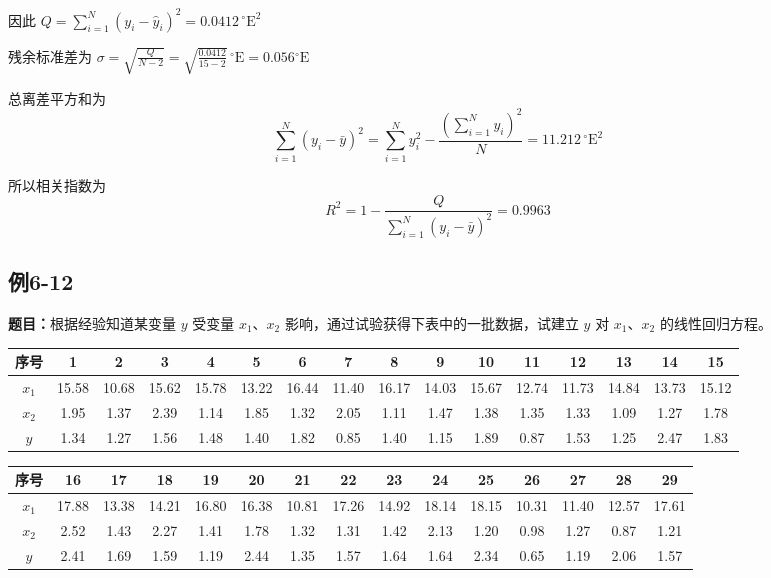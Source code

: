 \documentclass[UTF8,zihao=-4]{ctexart}
\newcommand{\problem}[1]{\subsection*{#1}}
\newcommand{\timu}{\noindent\textbf{题目：}}
\begin{document}
因此 $Q = \sum_{i=1}^{N}(y_i-\hat{y}_i)^2 = 0.0412\,{}^\circ\mathrm{E}^2$

残余标准差为 $\sigma = \sqrt{\frac{Q}{N-2}} = \sqrt{\frac{0.0412}{15-2}}\,{}^\circ\mathrm{E} = 0.056{}^\circ\mathrm{E}$

总离差平方和为
\begin{equation*}
    \sum_{i=1}^{N}(y_i-\bar{y})^2 = \sum_{i=1}^{N}y_i^2 - \frac{\left(\displaystyle\sum_{i=1}^{N}y_i\right)^2}{N} = 11.212\,{}^\circ\mathrm{E}^2
\end{equation*}

所以相关指数为
\begin{equation*}
    R^2 = 1- \frac{Q}{\displaystyle\sum_{i=1}^{N}(y_i-\bar{y})^2} = 0.9963
\end{equation*}

\newpage

\problem{例6-12}

\timu 根据经验知道某变量 $y$ 受变量 $x_1$、$x_2$ 影响，通过试验获得下表中的一批数据，试建立 $y$ 对 $x_1$、$x_2$ 的线性回归方程。

\begin{center}
\scriptsize
\setlength{\tabcolsep}{4pt}

\begin{tabular}{c|ccccccccccccccc}
\toprule
序号 & 1 & 2 & 3 & 4 & 5 & 6 & 7 & 8 & 9 & 10 & 11 & 12 & 13 & 14 & 15\\
\midrule
$x_1$ & 15.58 & 10.68 & 15.62 & 15.78 & 13.22 & 16.44 & 11.40 & 16.17 & 14.03 & 15.67 & 12.74 & 11.73 & 14.84 & 13.73 & 15.12\\
$x_2$ & 1.95 & 1.37 & 2.39 & 1.14 & 1.85 & 1.32 & 2.05 & 1.11 & 1.47 & 1.38 & 1.35 & 1.33 & 1.09 & 1.27 & 1.78\\
$y$   & 1.34 & 1.27 & 1.56 & 1.48 & 1.40 & 1.82 & 0.85 & 1.40 & 1.15 & 1.89 & 0.87 & 1.53 & 1.25 & 2.47 & 1.83\\
\bottomrule
\end{tabular}

\vspace{0.5em}

\begin{tabular}{c|cccccccccccccc}
\toprule
序号 & 16 & 17 & 18 & 19 & 20 & 21 & 22 & 23 & 24 & 25 & 26 & 27 & 28 & 29\\
\midrule
$x_1$ & 17.88 & 13.38 & 14.21 & 16.80 & 16.38 & 10.81 & 17.26 & 14.92 & 18.14 & 18.15 & 10.31 & 11.40 & 12.57 & 17.61\\
$x_2$ & 2.52 & 1.43 & 2.27 & 1.41 & 1.78 & 1.32 & 1.31 & 1.42 & 2.13 & 1.20 & 0.98 & 1.27 & 0.87 & 1.21\\
$y$   & 2.41 & 1.69 & 1.59 & 1.19 & 2.44 & 1.35 & 1.57 & 1.64 & 1.64 & 2.34 & 0.65 & 1.19 & 2.06 & 1.57\\
\bottomrule
\end{tabular}

\end{center}
\end{document}
